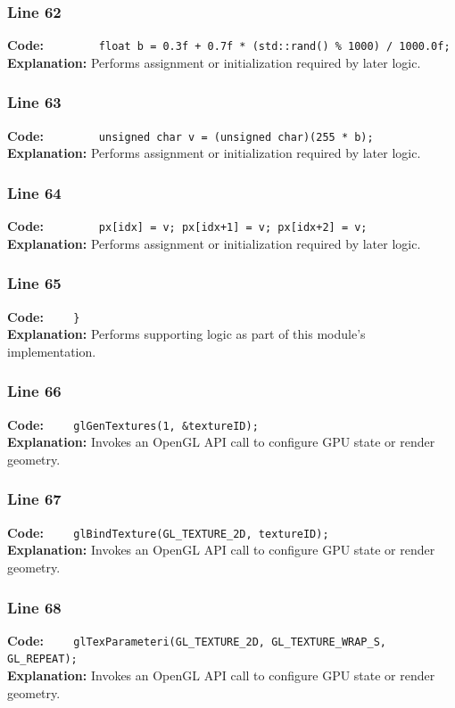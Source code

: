 \documentclass[11pt,a4paper]{article}
\begin{document}
\subsubsection*{Line 62}
\textbf{Code:} \verb|        float b = 0.3f + 0.7f * (std::rand() % 1000) / 1000.0f;|\\
\textbf{Explanation:} Performs assignment or initialization required by later logic.

\subsubsection*{Line 63}
\textbf{Code:} \verb|        unsigned char v = (unsigned char)(255 * b);|\\
\textbf{Explanation:} Performs assignment or initialization required by later logic.

\subsubsection*{Line 64}
\textbf{Code:} \verb|        px[idx] = v; px[idx+1] = v; px[idx+2] = v;|\\
\textbf{Explanation:} Performs assignment or initialization required by later logic.

\subsubsection*{Line 65}
\textbf{Code:} \verb|    }|\\
\textbf{Explanation:} Performs supporting logic as part of this module's implementation.

\subsubsection*{Line 66}
\textbf{Code:} \verb|    glGenTextures(1, &textureID);|\\
\textbf{Explanation:} Invokes an OpenGL API call to configure GPU state or render geometry.

\subsubsection*{Line 67}
\textbf{Code:} \verb|    glBindTexture(GL_TEXTURE_2D, textureID);|\\
\textbf{Explanation:} Invokes an OpenGL API call to configure GPU state or render geometry.

\subsubsection*{Line 68}
\textbf{Code:} \verb|    glTexParameteri(GL_TEXTURE_2D, GL_TEXTURE_WRAP_S, GL_REPEAT);|\\
\textbf{Explanation:} Invokes an OpenGL API call to configure GPU state or render geometry.
\end{document}
